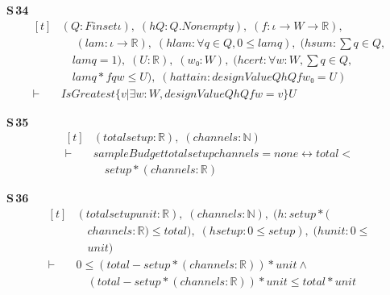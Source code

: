 \noindent\textbf{S\,34}\quad{}
{\footnotesize\[ \begin{aligned}[t]
&(\mathit{Q} : \mathit{Finset} \iota ),\; (\mathit{hQ} : \mathit{Q}.\mathit{Nonempty}),\; (\mathit{f} : \iota \to \mathit{W} \to \mathbb{R} ),\\
&\quad \; (\mathit{lam} : \iota \to \mathbb{R} ),\; (\mathit{hlam} : \forall \mathit{q} \in \mathit{Q}, 0 \leq \mathit{lam} \mathit{q}),\; (\mathit{hsum} : \textstyle\sum \mathit{q} \in \mathit{Q},\\
&\quad \mathit{lam} \mathit{q} = 1),\; (\mathit{U} : \mathbb{R} ),\; (\mathit{w₀} : \mathit{W}),\; (\mathit{hcert} : \forall \mathit{w} : \mathit{W}, \textstyle\sum \mathit{q} \in \mathit{Q},\\
&\quad \mathit{lam} \mathit{q} * \mathit{f} \mathit{q} \mathit{w} \leq \mathit{U}),\; (\mathit{hattain} : \mathit{designValue} \mathit{Q} \mathit{hQ} \mathit{f} \mathit{w₀} = \mathit{U})\\
\vdash\;&\mathit{IsGreatest} \{ \mathit{v} | \exists \mathit{w} : \mathit{W}, \mathit{designValue} \mathit{Q} \mathit{hQ} \mathit{f} \mathit{w} = \mathit{v}\} \mathit{U}
\end{aligned} \]}

\noindent\textbf{S\,35}\quad{}
{\footnotesize\[ \begin{aligned}[t]
&(\mathit{total} \mathit{setup} : \mathbb{R} ),\; (\mathit{channels} : \mathbb{N} )\\
\vdash\;&\mathit{sampleBudget} \mathit{total} \mathit{setup} \mathit{channels} = \mathit{none} \leftrightarrow \mathit{total} <\\
&\quad \mathit{setup} * (\mathit{channels} : \mathbb{R} )
\end{aligned} \]}

\noindent\textbf{S\,36}\quad{}
{\footnotesize\[ \begin{aligned}[t]
&(\mathit{total} \mathit{setup} \mathit{unit} : \mathbb{R} ),\; (\mathit{channels} : \mathbb{N} ),\; (\mathit{h} : \mathit{setup} * (\\
&\quad \mathit{channels} : \mathbb{R} ) \leq \mathit{total}),\; (\mathit{hsetup} : 0 \leq \mathit{setup}),\; (\mathit{hunit} : 0 \leq\\
&\quad \mathit{unit})\\
\vdash\;&0 \leq (\mathit{total} - \mathit{setup} * (\mathit{channels} : \mathbb{R} )) * \mathit{unit} \wedge\\
&\quad (\mathit{total} - \mathit{setup} * (\mathit{channels} : \mathbb{R} )) * \mathit{unit} \leq \mathit{total} * \mathit{unit}
\end{aligned} \]}

